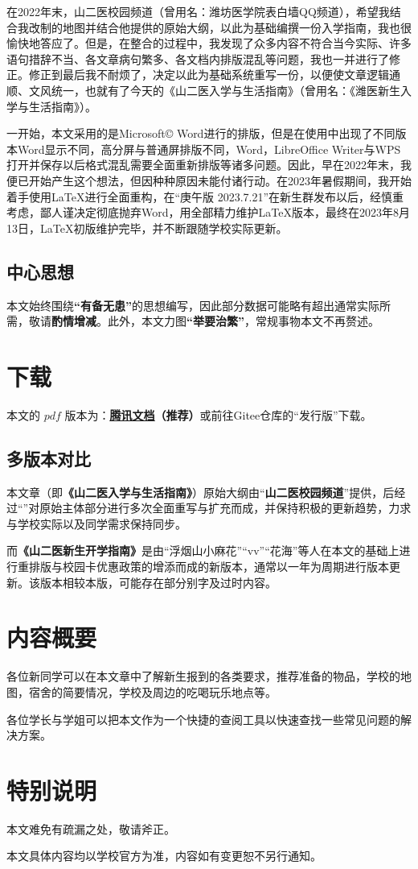 在2022年末，山二医校园频道（曾用名：潍坊医学院表白墙QQ频道），希望我结合我改制的地图并结合他提供的原始大纲，以此为基础编撰一份入学指南，我也很愉快地答应了。但是，在整合的过程中，我发现了众多内容不符合当今实际、许多语句措辞不当、各文章病句繁多、各文档内排版混乱等问题，我也一并进行了修正。修正到最后我不耐烦了，决定以此为基础系统重写一份，以便使文章逻辑通顺、文风统一，也就有了今天的《山二医入学与生活指南》（曾用名：《潍医新生入学与生活指南》）。

一开始，本文采用的是Microsoft© Word进行的排版，但是在使用中出现了不同版本Word显示不同，高分屏与普通屏排版不同，Word，LibreOffice Writer与WPS打开并保存以后格式混乱需要全面重新排版等诸多问题。因此，早在2022年末，我便已开始产生这个想法，但因种种原因未能付诸行动。在2023年暑假期间，我开始着手使用\LaTeX 进行全面重构，在“庚午版 2023.7.21”在新生群发布以后，经慎重考虑，鄙人谨决定彻底抛弃Word，用全部精力维护\LaTeX 版本，最终在2023年8月13日，\LaTeX 初版维护完毕，并不断跟随学校实际更新。

\subsection[中心思想]{中心思想}
本文始终围绕\textbf{“有备无患”}的思想编写，因此部分数据可能略有超出通常实际所需，敬请\textbf{酌情增减}。此外，本文力图\textbf{“举要治繁”}，常规事物本文不再赘述。

\section[下载]{下载}
本文的 $pdf$ 版本\textbf{}为：\textbf{\uline{\href{https://docs.qq.com/s/ETcQ-ZFSrSsh6MK9bm773q}{腾讯文档}}（推荐）}或前往Gitee仓库的“发行版”下载。


\subsection[多版本对比]{多版本对比}
本文章（即\textbf{《山二医入学与生活指南》}）原始大纲由“\textbf{山二医校园频道}”提供，后经过“\textbf{}”对原始主体部分进行多次全面重写与扩充而成，并保持积极的更新趋势，力求与学校实际以及同学需求保持同步。

而\textbf{《山二医新生开学指南》}是由“浮烟山小麻花”“vv”“花海”等人在本文的基础上进行重排版与校园卡优惠政策的增添而成的新版本，通常以一年为周期进行版本更新。该版本相较本版，可能存在部分别字及过时内容。

\textbf{}

\section[内容概要]{内容概要}

各位新同学可以在本文章中了解新生报到的各类要求，推荐准备的物品，学校的地图，宿舍的简要情况，学校及周边的吃喝玩乐地点等。

各位学长与学姐可以把本文作为一个快捷的查阅工具以快速查找一些常见问题的解决方案。

\section[特别说明]{特别说明}
本文难免有疏漏之处，敬请斧正。

本文具体内容均以学校官方为准，内容如有变更恕不另行通知。